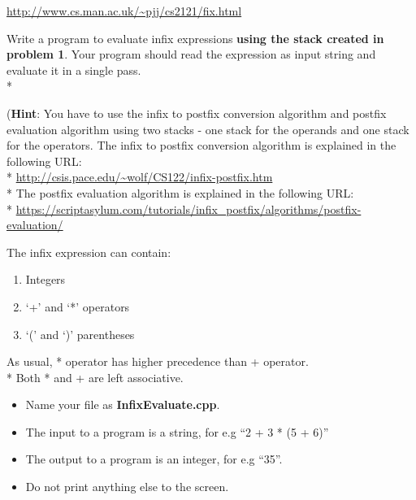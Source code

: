 \documentclass[14pt]{article}
\begin{document}
\url{http://www.cs.man.ac.uk/~pjj/cs2121/fix.html}


Write a program to evaluate infix expressions \textbf{using the stack created in problem 1}. Your program should read the expression as input string and evaluate it in a single pass. \\*

(\textbf{Hint}: You have to use the infix to postfix conversion algorithm and postfix evaluation algorithm using two stacks - one stack for the operands and one stack for the operators. The infix to postfix conversion algorithm is explained in the following URL: \\*
\url{http://csis.pace.edu/~wolf/CS122/infix-postfix.htm} \\*
The postfix evaluation algorithm is explained in the following URL: \\*
\url{https://scriptasylum.com/tutorials/infix_postfix/algorithms/postfix-evaluation/}

The infix expression can contain:
\begin{enumerate}
    \item Integers
    \item `+' and `*' operators
    \item `(' and `)' parentheses
\end{enumerate}

As usual, * operator has higher precedence than + operator. \\*
Both * and + are left associative.

\begin{itemize}
    \item Name your file as \textbf{InfixEvaluate.cpp}.
    \item The input to a program is a string, for e.g ``2 + 3 * (5 + 6)''
    \item The output to a program is an integer, for e.g ``35''.
    \item Do not print anything else to the screen.
\end{itemize}
\end{document}
